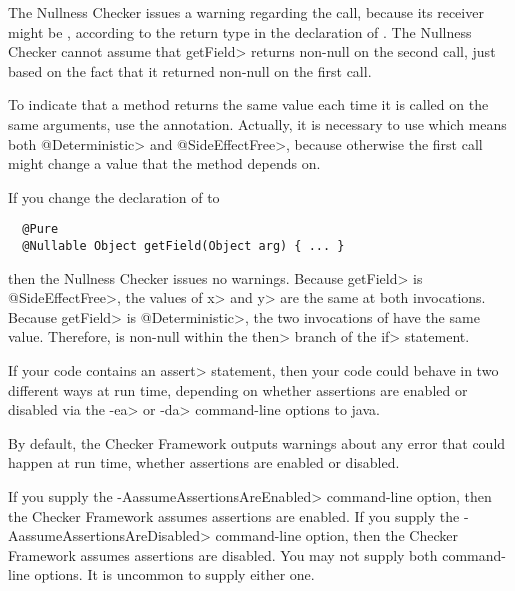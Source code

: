The Nullness Checker issues a warning regarding the
 call, because its receiver  might
be , according to the  return type in the
declaration of .  The Nullness Checker cannot assume that
\<getField> returns non-null on the second call, just based on the fact
that it returned non-null on the first call.

To indicate that a method returns the same value each time it is called on
the same arguments, use the  annotation.
Actually, it is necessary to use  which
means both \<@Deterministic> and \<@SideEffectFree>, because otherwise the
first call might change a value that the method depends on.

If you change the declaration of  to

\begin{Verbatim}
  @Pure
  @Nullable Object getField(Object arg) { ... }
\end{Verbatim}

\noindent
then the Nullness Checker issues no warnings.
Because \<getField> is \<@SideEffectFree>, the values of \<x> and \<y> are the
same at both invocations.
Because \<getField> is \<@Deterministic>, the two invocations of
 have the same value.
Therefore,  is non-null within the \<then> branch
of the \<if> statement.




If your code contains an \<assert> statement, then your code could behave
in two different ways at run time, depending on whether assertions are
enabled or disabled
via the \<-ea> or \<-da> command-line options to java.

By default, the Checker Framework outputs warnings about any error that
could happen at run time, whether assertions are enabled or disabled.

If you supply the \<-AassumeAssertionsAreEnabled> command-line option, then
the Checker Framework assumes assertions are enabled.  If you supply the
\<-AassumeAssertionsAreDisabled> command-line option, then the Checker
Framework assumes assertions are disabled.  You may not supply both
command-line options.  It is uncommon to supply either one.

